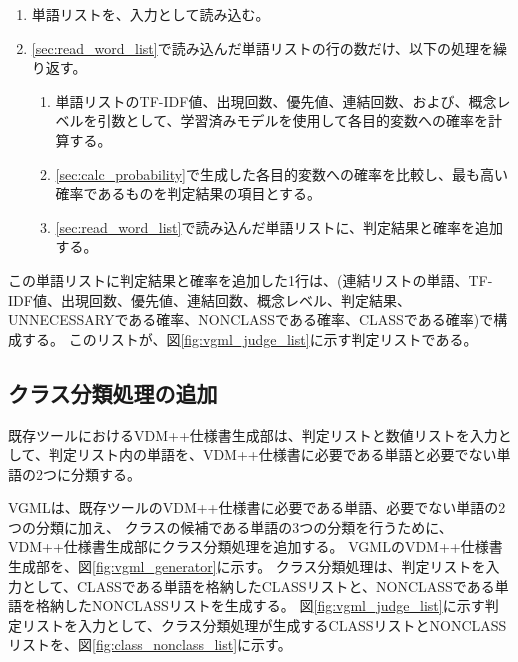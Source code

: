 \begin{enumerate}
    \item 単語リストを、入力として読み込む。
    \label{sec:read_word_list}
    \item \ref{sec:read_word_list}で読み込んだ単語リストの行の数だけ、以下の処理を繰り返す。
        \begin{enumerate}
            \item 単語リストのTF-IDF値、出現回数、優先値、連結回数、および、概念レベルを引数として、学習済みモデルを使用して各目的変数への確率を計算する。
            \label{sec:calc_probability}
            \item \ref{sec:calc_probability}で生成した各目的変数への確率を比較し、最も高い確率であるものを判定結果の項目とする。
            \item \ref{sec:read_word_list}で読み込んだ単語リストに、判定結果と確率を追加する。
        \end{enumerate}
\end{enumerate}

この単語リストに判定結果と確率を追加した1行は、(連結リストの単語、TF-IDF値、出現回数、優先値、連結回数、概念レベル、判定結果、UNNECESSARYである確率、NONCLASSである確率、CLASSである確率)で構成する。
このリストが、図\ref{fig:vgml_judge_list}に示す判定リストである。

\subsection{クラス分類処理の追加}
\label{sec:classifier_class}
既存ツールにおけるVDM++仕様書生成部は、判定リストと数値リストを入力として、判定リスト内の単語を、VDM++仕様書に必要である単語と必要でない単語の2つに分類する。

VGMLは、既存ツールのVDM++仕様書に必要である単語、必要でない単語の2つの分類に加え、
クラスの候補である単語の3つの分類を行うために、VDM++仕様書生成部にクラス分類処理を追加する。
VGMLのVDM++仕様書生成部を、図\ref{fig:vgml_generator}に示す。
クラス分類処理は、判定リストを入力として、CLASSである単語を格納したCLASSリストと、NONCLASSである単語を格納したNONCLASSリストを生成する。
図\ref{fig:vgml_judge_list}に示す判定リストを入力として、クラス分類処理が生成するCLASSリストとNONCLASSリストを、図\ref{fig:class_nonclass_list}に示す。

